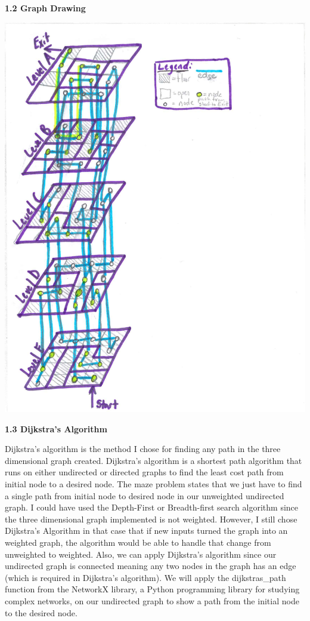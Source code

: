 \documentclass[12pt]{article}
\begin{document}
\vspace{0.1in}
\textbf{1.2 Graph Drawing}

\includegraphics{figure1}

\textbf{1.3 Dijkstra's Algorithm}

Dijkstra's algorithm is the method I chose for finding any path in the three dimensional graph created. Dijkstra's algorithm is a shortest path algorithm that runs on either undirected or directed graphs to find the least cost path from initial node to a desired node. The maze problem states that we just have to find a single path from initial node to desired node in our unweighted undirected graph. I could have used the Depth-First or Breadth-first search algorithm since the three dimensional graph implemented is not weighted. However, I still chose Dijkstra's Algorithm in that case that if new inputs turned the graph into an weighted graph, the algorithm would be able to handle that change from unweighted to weighted. Also, we can apply Dijkstra's algorithm since our undirected graph is connected meaning any two nodes in the graph has an edge (which is required in Dijkstra's algorithm). We will apply the dijkstras\_path function from the NetworkX library, a Python programming library for studying complex networks, on our undirected graph to show a path from the initial node to the desired node. \\
\end{document}
